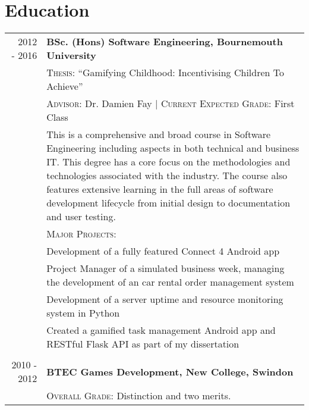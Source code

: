 \section{Education}
\begin{tabular}{r|p{11cm}}
	\ 2012 - 2016 & \textbf{BSc. (Hons) Software Engineering, Bournemouth University}\\ 
	\ & \textsc{Thesis}: ``Gamifying Childhood: Incentivising Children To Achieve'' \\
	\ & \textsc{Advisor}: Dr. Damien Fay | \normalsize \textsc{Current Expected Grade}: First Class \\
	\ & \footnotesize This is a comprehensive and broad course in Software Engineering including aspects in both technical and business IT. This degree has a core focus on the methodologies and technologies associated with the industry. The course also features extensive learning in the full areas of software development lifecycle from initial design to documentation and user testing. \\
	\ & \textsc{Major Projects}: \\
	\ & \tabitem Development of a fully featured Connect 4 Android app \\
	\ & \tabitem Project Manager of a simulated business week, managing the development of an car rental order management system \\
	\ &	\tabitem Development of a server uptime and resource monitoring system in Python \\
	\ &	\tabitem Created a gamified task management Android app and RESTful Flask API as part of my dissertation \\

	\multicolumn{2}{c}{} \\


	2010 - 2012 & \textbf{BTEC Games Development, New College, Swindon}\\
	\ & \textsc{Overall Grade}: Distinction and two merits.
\end{tabular}
